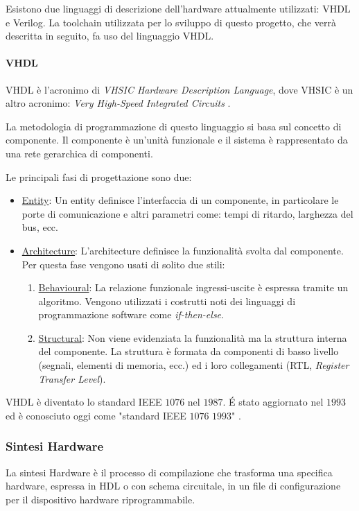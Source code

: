Esistono due linguaggi di descrizione dell'hardware attualmente utilizzati: VHDL e Verilog. La toolchain utilizzata per lo sviluppo di questo progetto, che verrà descritta in seguito, fa uso del linguaggio VHDL.

\paragraph{VHDL}
VHDL è l'acronimo di \textit{VHSIC Hardware Description Language}, dove VHSIC è un altro acronimo: \textit{Very High-Speed Integrated Circuits} \cite{storeyelet}.

La metodologia di programmazione di questo linguaggio si basa sul concetto di componente. Il componente è un'unità funzionale e il sistema è rappresentato da una rete gerarchica di componenti.

Le principali fasi di progettazione sono due:
\begin{itemize}
	\item \underline{Entity}: Un entity definisce l'interfaccia di un componente, in particolare le porte di comunicazione e altri parametri come: tempi di ritardo, larghezza del bus, ecc.
	\item \underline{Architecture}: L'architecture definisce la funzionalità svolta dal componente. Per questa fase vengono usati di solito due stili:
	\begin{enumerate}
		\item \underline{Behavioural}: La relazione funzionale ingressi-uscite è espressa tramite un algoritmo. Vengono utilizzati i costrutti noti dei linguaggi di programmazione software come \textit{if-then-else}.
		\item \underline{Structural}: Non viene evidenziata la funzionalità ma la struttura interna del componente. La struttura è formata da componenti di basso livello (segnali, elementi di memoria, ecc.) ed i loro collegamenti (RTL, \textit{Register Transfer Level}).
	\end{enumerate} 
\end{itemize}

VHDL è diventato lo standard IEEE $1076$ nel $1987$. \'E stato aggiornato nel $1993$ ed è conosciuto oggi come "standard IEEE $1076$ $1993$" \cite{545676}. 
		
\subsubsection{Sintesi Hardware}
La sintesi Hardware è il processo di compilazione che trasforma una specifica hardware, espressa in HDL o con schema circuitale, in un file di configurazione per il dispositivo hardware riprogrammabile.


